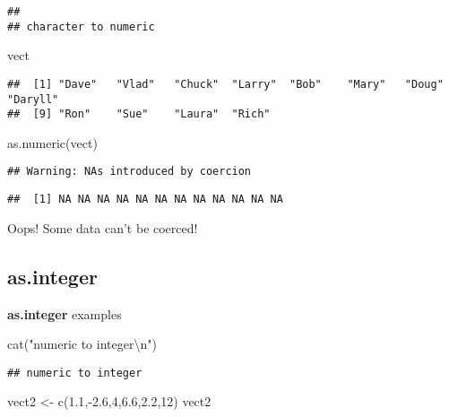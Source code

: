 \documentclass[
]{article}
\newenvironment{Shaded}{\begin{snugshade}}{\end{snugshade}}
\newcommand{\DecValTok}[1]{\textcolor[rgb]{0.00,0.00,0.81}{#1}}
\newcommand{\FloatTok}[1]{\textcolor[rgb]{0.00,0.00,0.81}{#1}}
\newcommand{\FunctionTok}[1]{\textcolor[rgb]{0.00,0.00,0.00}{#1}}
\newcommand{\NormalTok}[1]{#1}
\newcommand{\OtherTok}[1]{\textcolor[rgb]{0.56,0.35,0.01}{#1}}
\newcommand{\SpecialCharTok}[1]{\textcolor[rgb]{0.00,0.00,0.00}{#1}}
\newcommand{\StringTok}[1]{\textcolor[rgb]{0.31,0.60,0.02}{#1}}
\begin{document}
\begin{verbatim}
## 
## character to numeric
\end{verbatim}

\begin{Shaded}
\begin{Highlighting}[]
\NormalTok{vect}
\end{Highlighting}
\end{Shaded}

\begin{verbatim}
##  [1] "Dave"   "Vlad"   "Chuck"  "Larry"  "Bob"    "Mary"   "Doug"   "Daryll"
##  [9] "Ron"    "Sue"    "Laura"  "Rich"
\end{verbatim}

\begin{Shaded}
\begin{Highlighting}[]
\FunctionTok{as.numeric}\NormalTok{(vect)}
\end{Highlighting}
\end{Shaded}

\begin{verbatim}
## Warning: NAs introduced by coercion
\end{verbatim}

\begin{verbatim}
##  [1] NA NA NA NA NA NA NA NA NA NA NA NA
\end{verbatim}

Oops! Some data can't be coerced!

\hypertarget{as.integer}{%
\subsection{as.integer}\label{as.integer}}

\textbf{as.integer} examples

\begin{Shaded}
\begin{Highlighting}[]
\FunctionTok{cat}\NormalTok{(}\StringTok{"numeric to integer}\SpecialCharTok{\textbackslash{}n}\StringTok{"}\NormalTok{)}
\end{Highlighting}
\end{Shaded}

\begin{verbatim}
## numeric to integer
\end{verbatim}

\begin{Shaded}
\begin{Highlighting}[]
\NormalTok{vect2 }\OtherTok{\textless{}{-}} \FunctionTok{c}\NormalTok{(}\FloatTok{1.1}\NormalTok{,}\SpecialCharTok{{-}}\FloatTok{2.6}\NormalTok{,}\DecValTok{4}\NormalTok{,}\FloatTok{6.6}\NormalTok{,}\FloatTok{2.2}\NormalTok{,}\DecValTok{12}\NormalTok{)}
\NormalTok{vect2}
\end{Highlighting}
\end{Shaded}
\end{document}
